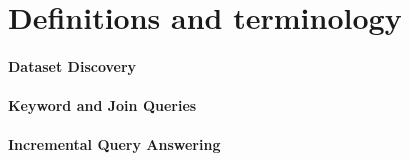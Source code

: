 \section{Definitions and terminology}
\label{sec:background}
\paragraph{Dataset Discovery}
\paragraph{Keyword and Join Queries}
\paragraph{Incremental Query Answering}
